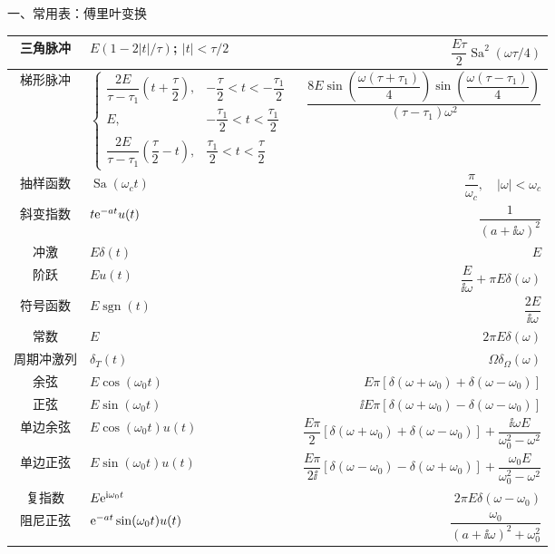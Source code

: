 \documentclass[a4paper]{ctexart}
\newcommand{\Sa}{\operatorname{Sa}}
\begin{document}
\begin{cheatsheetcolumns}[2]
\begin{card}{一、常用表：傅里叶变换}
{\begin{tabularx}{\linewidth}{@{}S|M|R@{}}
      三角脉冲 & $E(1-2|t|/\tau)$; $|t|<\tau/2$
        & $\dfrac{E\tau}{2}\Sa^2(\omega\tau/4)$ \\ \hline
      梯形脉冲 & $\begin{cases}
        \dfrac{2E}{\tau-\tau_1}(t+\dfrac{\tau}{2}),& -\dfrac{\tau}{2}<t<-\dfrac{\tau_1}{2}\\
        E,& -\dfrac{\tau_1}{2}<t<\dfrac{\tau_1}{2}\\
        \dfrac{2E}{\tau-\tau_1}(\dfrac{\tau}{2}-t),& \dfrac{\tau_1}{2}<t<\dfrac{\tau}{2}
      \end{cases}$
        & $\dfrac{8E\sin\!\left(\dfrac{\omega(\tau+\tau_1)}{4}\right)\sin\!\left(\dfrac{\omega(\tau-\tau_1)}{4}\right)}{(\tau-\tau_1)\omega^2}$ \\ \hline
      抽样函数 & $\Sa(\omega_c t)$
        & $\dfrac{\pi}{\omega_c},\quad |\omega|<\omega_c$ \\ \hline
      斜变指数 & $t\mathrm{e}^{-at}u(t)$
        & $\dfrac{1}{(a+\ii\omega)^2}$ \\ \hline
      冲激 & $E\delta(t)$
        & $E$ \\ \hline
      阶跃 & $Eu(t)$
        & $\dfrac{E}{\ii\omega}+\pi E\delta(\omega)$ \\ \hline
      符号函数 & $E\operatorname{sgn}(t)$
        & $\dfrac{2E}{\ii\omega}$ \\ \hline
      常数 & $E$
        & $2\pi E\delta(\omega)$ \\ \hline
      周期冲激列 & $\delta_T(t)$
        & $\Omega\delta_\Omega(\omega)$ \\ \hline
      余弦 & $E\cos(\omega_0t)$
        & $E\pi[\delta(\omega+\omega_0)+\delta(\omega-\omega_0)]$ \\ \hline
      正弦 & $E\sin(\omega_0t)$
        & $\ii E\pi[\delta(\omega+\omega_0)-\delta(\omega-\omega_0)]$ \\ \hline
      单边余弦 & $E\cos(\omega_0t)u(t)$
        & $\dfrac{E\pi}{2}[\delta(\omega+\omega_0)+\delta(\omega-\omega_0)]+\dfrac{\ii\omega E}{\omega_0^2-\omega^2}$ \\ \hline
      单边正弦 & $E\sin(\omega_0t)u(t)$
        & $\dfrac{E\pi}{2\ii}[\delta(\omega-\omega_0)-\delta(\omega+\omega_0)]+\dfrac{\omega_0E}{\omega_0^2-\omega^2}$ \\ \hline
      复指数 & $E\mathrm{e}^{\mathrm{i}\omega_0t}$
        & $2\pi E\delta(\omega-\omega_0)$ \\ \hline
      阻尼正弦 & $\mathrm{e}^{-at}\sin(\omega_0t)u(t)$
        & $\dfrac{\omega_0}{(a+\ii\omega)^2+\omega_0^2}$ \\ \hline

\end{tabularx}}
\end{card}
\end{cheatsheetcolumns}
\end{document}
